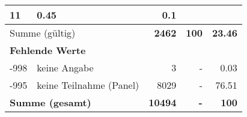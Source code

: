 \begin{longtable}{lXrrr}
       \num{11} &
       \num[round-mode=places,round-precision=2]{0.45} &
         \num[round-mode=places,round-precision=2]{0.1} \\
     \midrule
     \multicolumn{2}{l}{Summe (gültig)} &
       \textbf{\num{2462}} &
     \textbf{\num{100}} &
       \textbf{\num[round-mode=places,round-precision=2]{23.46}} \\
     \multicolumn{5}{l}{\textbf{Fehlende Werte}}\\
       -998 &
       keine Angabe &
         \num{3} &
        - &
         \num[round-mode=places,round-precision=2]{0.03} \\
       -995 &
       keine Teilnahme (Panel) &
         \num{8029} &
        - &
         \num[round-mode=places,round-precision=2]{76.51} \\
     \midrule
     \multicolumn{2}{l}{\textbf{Summe (gesamt)}} &
          \textbf{\num{10494}} &
        \textbf{-} &
        \textbf{\num{100}} \\
     \bottomrule
     \end{longtable}
     
